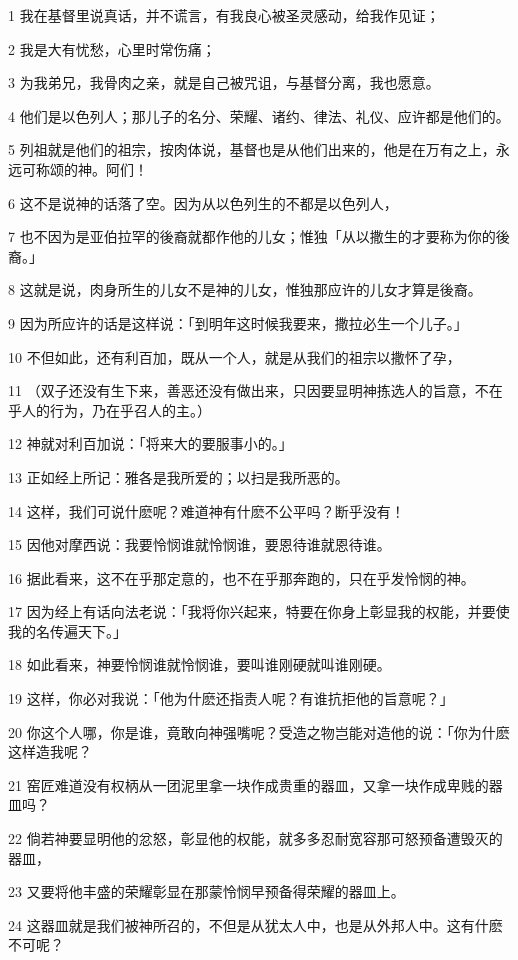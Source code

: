\par 1 我在基督里说真话，并不谎言，有我良心被圣灵感动，给我作见证；
\par 2 我是大有忧愁，心里时常伤痛；
\par 3 为我弟兄，我骨肉之亲，就是自己被咒诅，与基督分离，我也愿意。
\par 4 他们是以色列人；那儿子的名分、荣耀、诸约、律法、礼仪、应许都是他们的。
\par 5 列祖就是他们的祖宗，按肉体说，基督也是从他们出来的，他是在万有之上，永远可称颂的神。阿们！
\par 6 这不是说神的话落了空。因为从以色列生的不都是以色列人，
\par 7 也不因为是亚伯拉罕的後裔就都作他的儿女；惟独「从以撒生的才要称为你的後裔。」
\par 8 这就是说，肉身所生的儿女不是神的儿女，惟独那应许的儿女才算是後裔。
\par 9 因为所应许的话是这样说：「到明年这时候我要来，撒拉必生一个儿子。」
\par 10 不但如此，还有利百加，既从一个人，就是从我们的祖宗以撒怀了孕，
\par 11 （双子还没有生下来，善恶还没有做出来，只因要显明神拣选人的旨意，不在乎人的行为，乃在乎召人的主。）
\par 12 神就对利百加说：「将来大的要服事小的。」
\par 13 正如经上所记：雅各是我所爱的；以扫是我所恶的。
\par 14 这样，我们可说什麽呢？难道神有什麽不公平吗？断乎没有！
\par 15 因他对摩西说：我要怜悯谁就怜悯谁，要恩待谁就恩待谁。
\par 16 据此看来，这不在乎那定意的，也不在乎那奔跑的，只在乎发怜悯的神。
\par 17 因为经上有话向法老说：「我将你兴起来，特要在你身上彰显我的权能，并要使我的名传遍天下。」
\par 18 如此看来，神要怜悯谁就怜悯谁，要叫谁刚硬就叫谁刚硬。
\par 19 这样，你必对我说：「他为什麽还指责人呢？有谁抗拒他的旨意呢？」
\par 20 你这个人哪，你是谁，竟敢向神强嘴呢？受造之物岂能对造他的说：「你为什麽这样造我呢？
\par 21 窑匠难道没有权柄从一团泥里拿一块作成贵重的器皿，又拿一块作成卑贱的器皿吗？
\par 22 倘若神要显明他的忿怒，彰显他的权能，就多多忍耐宽容那可怒预备遭毁灭的器皿，
\par 23 又要将他丰盛的荣耀彰显在那蒙怜悯早预备得荣耀的器皿上。
\par 24 这器皿就是我们被神所召的，不但是从犹太人中，也是从外邦人中。这有什麽不可呢？
